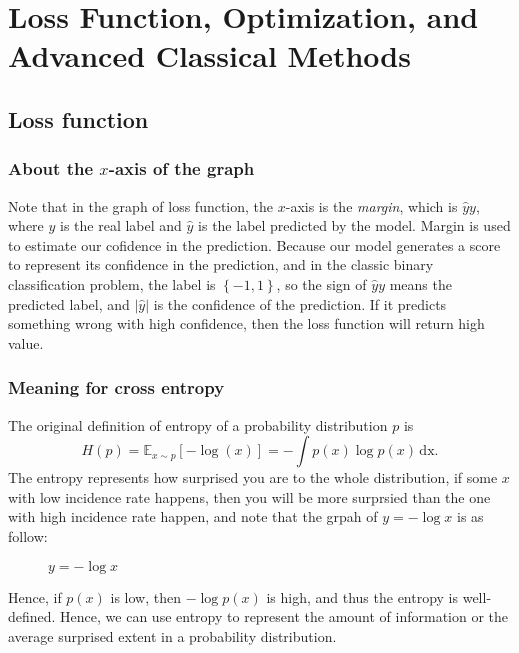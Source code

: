 \chapter{Loss Function, Optimization, and Advanced Classical Methods}
\section{Loss function}
\subsection{About the \(x\)-axis of the graph}
Note that in the graph of loss function, the \(x\)-axis is the \textit{margin}, which is \(\hat{y}y \), where \(y\) is the real label and \(\hat{y} \) is the label predicted by the model. Margin is used to estimate our cofidence in the prediction. Because our model generates a score to represent its confidence in the prediction, and in the classic binary classification problem, the label is \(\left\{ -1, 1 \right\} \), so the sign of \(\hat{y} y\) means the predicted label, and \(\vert \hat{y}  \vert \) is the confidence of the prediction. If it predicts something wrong with high confidence, then the loss function will return high value.   
\subsection{Meaning for cross entropy}
The original definition of entropy of a probability distribution \(p\) is 
\[
	H(p) = \mathbb{E} _{x \sim p} [-\log (x)] = -\int p(x) \log p(x) \, \mathrm{dx}. 
\]
The entropy represents how surprised you are to the whole distribution, if some \(x\) with low incidence rate happens, then you will be more surprsied than the one with high incidence rate happen, and note that the grpah of \(y = -\log x\) is as follow:
\begin{figure}[H]
	\centering
	\caption{\(y = -\log x\)}
\end{figure}
Hence, if \(p(x)\) is low, then \(-\log p(x)\) is high, and thus the entropy is well-defined. Hence, we can use entropy to represent the amount of information or the average surprised extent in a probability distribution. 

